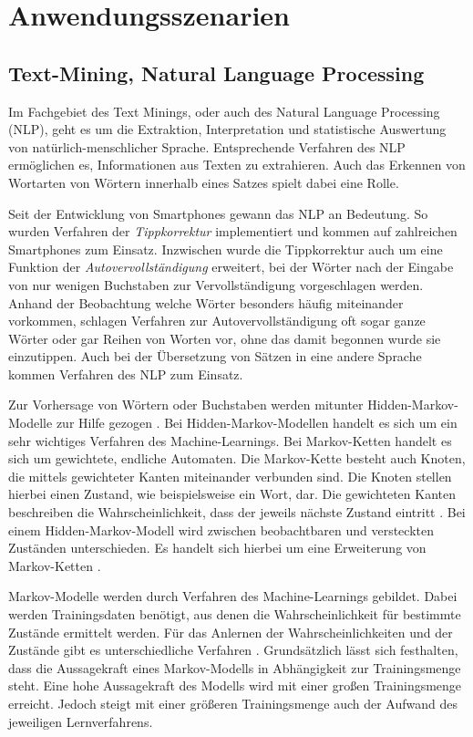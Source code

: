 \section{Anwendungsszenarien}%
\subsection{Text-Mining, Natural Language Processing}
Im Fachgebiet des Text Minings, oder auch des Natural Language Processing (NLP), geht es um die Extraktion, Interpretation und statistische Auswertung von natürlich-menschlicher Sprache. Entsprechende Verfahren des NLP ermöglichen es, Informationen aus Texten zu extrahieren. Auch das Erkennen von Wortarten von Wörtern innerhalb eines Satzes spielt dabei eine Rolle.

Seit der Entwicklung von Smartphones gewann das NLP an Bedeutung. So wurden Verfahren der \emph{Tippkorrektur} implementiert und kommen auf zahlreichen Smartphones zum Einsatz. Inzwischen wurde die Tippkorrektur auch um eine Funktion der \emph{Autovervollständigung} erweitert, bei der Wörter nach der Eingabe von nur wenigen Buchstaben zur Vervollständigung vorgeschlagen werden. Anhand der Beobachtung welche Wörter besonders häufig miteinander vorkommen, schlagen Verfahren zur Autovervollständigung oft sogar ganze Wörter oder gar Reihen von Worten vor, ohne das damit begonnen wurde sie einzutippen. Auch bei der Übersetzung von Sätzen in eine andere Sprache kommen Verfahren des NLP zum Einsatz.

Zur Vorhersage von Wörtern oder Buchstaben werden mitunter Hidden-Markov-Modelle zur Hilfe gezogen \cite[p.~207]{jurafsky01}. Bei Hidden-Markov-Modellen handelt es sich um ein sehr wichtiges Verfahren des Machine-Learnings. Bei Markov-Ketten handelt es sich um gewichtete, endliche Automaten. Die Markov-Kette besteht auch Knoten, die mittels gewichteter Kanten miteinander verbunden sind. Die Knoten stellen hierbei einen Zustand, wie beispielsweise ein Wort, dar. Die gewichteten Kanten beschreiben die Wahrscheinlichkeit, dass der jeweils nächste Zustand eintritt \cite[p.~208 ff.]{jurafsky01}\cite[p.~318 ff.]{manning01}. Bei einem Hidden-Markov-Modell wird zwischen beobachtbaren und versteckten Zuständen unterschieden. Es handelt sich hierbei um eine Erweiterung von Markov-Ketten \cite[p.~211 ff.]{jurafsky01}. 

Markov-Modelle werden durch Verfahren des Machine-Learnings gebildet. Dabei werden Trainingsdaten benötigt, aus denen die Wahrscheinlichkeit für bestimmte Zustände ermittelt werden. Für das Anlernen der Wahrscheinlichkeiten und der Zustände gibt es unterschiedliche Verfahren \cite[p.~213 ff.]{jurafsky01}\cite[p.~326 ff.]{manning01}. Grundsätzlich lässt sich festhalten, dass die Aussagekraft eines Markov-Modells in Abhängigkeit zur Trainingsmenge steht. Eine hohe Aussagekraft des Modells wird mit einer großen Trainingsmenge erreicht. Jedoch steigt mit einer größeren Trainingsmenge auch der Aufwand des jeweiligen Lernverfahrens.

